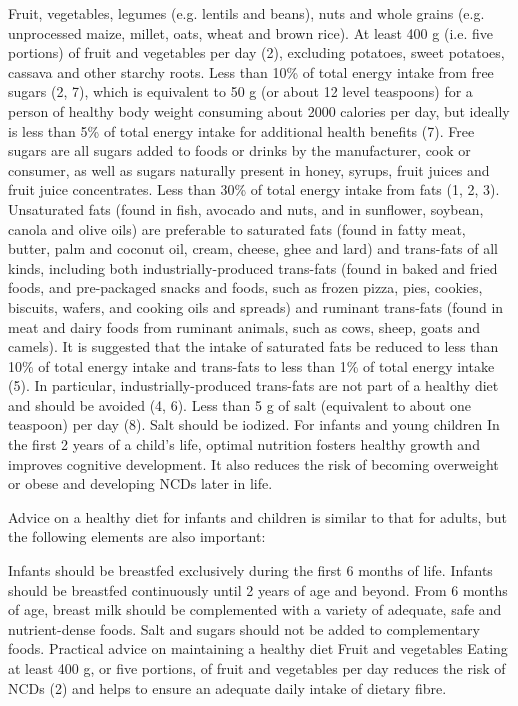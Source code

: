 \documentclass[
  letterpaper,
  DIV=11,
  numbers=noendperiod]{scrreprt}
\newenvironment{Shaded}{\begin{snugshade}}{\end{snugshade}}
\newcommand{\SpecialCharTok}[1]{\textcolor[rgb]{0.37,0.37,0.37}{#1}}
\newcommand{\StringTok}[1]{\textcolor[rgb]{0.13,0.47,0.30}{#1}}
\begin{document}
\begin{Shaded}
\begin{Highlighting}[]
\StringTok{Fruit, vegetables, legumes (e.g. lentils and beans), nuts and whole grains (e.g. unprocessed maize, millet, oats, wheat and brown rice).}
\StringTok{At least 400 g (i.e. five portions) of fruit and vegetables per day (2), excluding potatoes, sweet potatoes, cassava and other starchy roots.}
\StringTok{Less than 10}\SpecialCharTok{\% o}\StringTok{f total energy intake from free sugars (2, 7), which is equivalent to 50 g (or about 12 level teaspoons) for a person of healthy body weight consuming about 2000 calories per day, but ideally is less than 5}\SpecialCharTok{\% o}\StringTok{f total energy intake for additional health benefits (7). Free sugars are all sugars added to foods or drinks by the manufacturer, cook or consumer, as well as sugars naturally present in honey, syrups, fruit juices and fruit juice concentrates.}
\StringTok{Less than 30}\SpecialCharTok{\% o}\StringTok{f total energy intake from fats (1, 2, 3). Unsaturated fats (found in fish, avocado and nuts, and in sunflower, soybean, canola and olive oils) are preferable to saturated fats (found in fatty meat, butter, palm and coconut oil, cream, cheese, ghee and lard) and trans{-}fats of all kinds, including both industrially{-}produced trans{-}fats (found in baked and fried foods, and pre{-}packaged snacks and foods, such as frozen pizza, pies, cookies, biscuits, wafers, and cooking oils and spreads) and ruminant trans{-}fats (found in meat and dairy foods from ruminant animals, such as cows, sheep, goats and camels). It is suggested that the intake of saturated fats be reduced to less than 10}\SpecialCharTok{\% o}\StringTok{f total energy intake and trans{-}fats to less than 1}\SpecialCharTok{\% o}\StringTok{f total energy intake (5). In particular, industrially{-}produced trans{-}fats are not part of a healthy diet and should be avoided (4, 6).}
\StringTok{Less than 5  g of salt (equivalent to about one teaspoon) per day (8).  Salt should be iodized.}
\StringTok{For infants and young children}
\StringTok{In the first 2 years of a child’s life, optimal nutrition fosters healthy growth and improves cognitive development. It also reduces the risk of becoming overweight or obese and developing NCDs later in life.}

\StringTok{Advice on a healthy diet for infants and children is similar to that for adults, but the following elements are also important:}

\StringTok{Infants should be breastfed exclusively during the first 6 months of life.}
\StringTok{Infants should be breastfed continuously until 2 years of age and beyond.}
\StringTok{From 6 months of age, breast milk should be complemented with a variety of adequate, safe and nutrient{-}dense foods. Salt and sugars should not be added to complementary foods.}
\StringTok{Practical advice on maintaining a healthy diet}
\StringTok{Fruit and vegetables}
\StringTok{Eating at least 400 g, or five portions, of fruit and vegetables per day reduces the risk of NCDs (2) and helps to ensure an adequate daily intake of dietary fibre.}


\end{Highlighting}
\end{Shaded}
\end{document}
